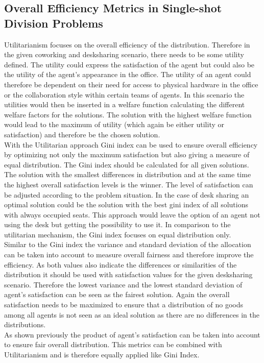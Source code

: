 \documentclass[german, a4paper, 11pt, oneside]{scrbook}
\begin{document}
\subsection{Overall Efficiency Metrics in Single-shot Division Problems}
Utilitarianism focuses on the overall efficiency of the distribution. Therefore in the given coworking and desksharing scenario, there needs to be some utility defined. The utility could express the satisfaction of the agent but could also be the utility of the agent's appearance in the office. The utility of an agent could therefore be dependent on their need for access to physical hardware in the office or the collaboration style within certain teams of agents. In this scenario the utilities would then be inserted in a welfare function calculating the different welfare factors for the solutions. The solution with the highest welfare function would lead to the maximum of utility (which again be either utility or satisfaction) and therefore be the chosen solution. \\With the Utilitarian approach Gini index can be used to ensure overall efficiency by optimizing not only the maximum satisfaction but also giving a measure of equal distribution. The Gini index should be calculated for all given solutions. The solution with the smallest differences in distribution and at the same time the highest overall satisfaction levels is the winner. The level of satisfaction can be adjusted according to the problem situation. In the case of desk sharing an optimal solution could be the solution with the best gini index of all solutions with always occupied seats. This approach would leave the option of an agent not using the desk but getting the possibility to use it. In comparison to the utilitarian mechanism, the Gini index focuses on equal distribution only.
\\Similar to the Gini index the variance and standard deviation of the allocation can be taken into account to measure overall fairness and therefore improve the efficiency. As both values also indicate the differences or similarities of the distribution it should be used with satisfaction values for the given desksharing scenario. Therefore the lowest variance and the lowest standard deviation of agent's satisfaction can be seen as the fairest solution. Again the overall satisfaction needs to be maximized to ensure that a distribution of no goods among all agents is not seen as an ideal solution as there are no differences in the distributions.
\\ As shown previously the product of agent's satisfaction can be taken into account to ensure fair overall distribution. This metrics can be combined with Utilitarianism and is therefore equally applied like Gini Index.
\end{document}
